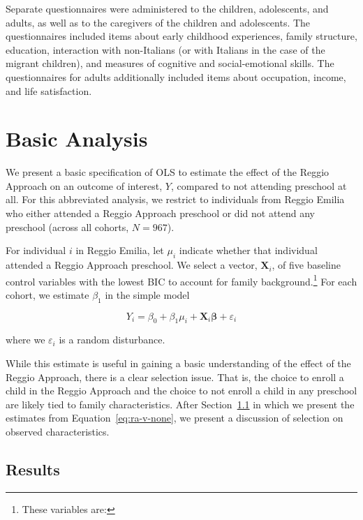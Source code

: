 Separate questionnaires were administered to the children, adolescents, and adults, as well as to the caregivers of the children and adolescents. The questionnaires included items about early childhood experiences, family structure, education, interaction with non-Italians (or with Italians in the case of the migrant children), and measures of cognitive and social-emotional skills. The questionnaires for adults additionally included items about occupation, income, and life satisfaction. 

\section{Basic Analysis}
\label{sec:methodology}

We present a basic specification of OLS to estimate the effect of the Reggio Approach on an outcome of interest, $Y$, compared to not attending preschool at all. For this abbreviated analysis, we restrict to individuals from Reggio Emilia who either attended a Reggio Approach preschool or did not attend any preschool (across all cohorts, $N = 967$).

For individual $i$ in Reggio Emilia, let $\mu_i$ indicate whether that individual attended a Reggio Approach preschool. We select a vector, $\bm{X}_i$, of five baseline control variables with the lowest BIC to account for family background.\footnote{These variables are: \color{maroon}{forthcoming}} For each cohort, we estimate $\beta_1$ in the simple model

\begin{equation}
	Y_i = \beta_0 + \beta_1 \mu_i + \bm{X}_i\bm{\beta} + \varepsilon_i
	\label{eq:ra-v-none}
\end{equation}

\noindent where we $\varepsilon_i$ is a random disturbance. 

While this estimate is useful in gaining a basic understanding of the effect of the Reggio Approach, there is a clear selection issue. That is, the choice to enroll a child in the Reggio Approach and the choice to not enroll a child in any preschool are likely tied to family characteristics. After Section~\ref{sec:results} in which we present the estimates from Equation~\eqref{eq:ra-v-none}, we present a discussion of selection on observed characteristics.

\subsection{Results}
\label{sec:results}


